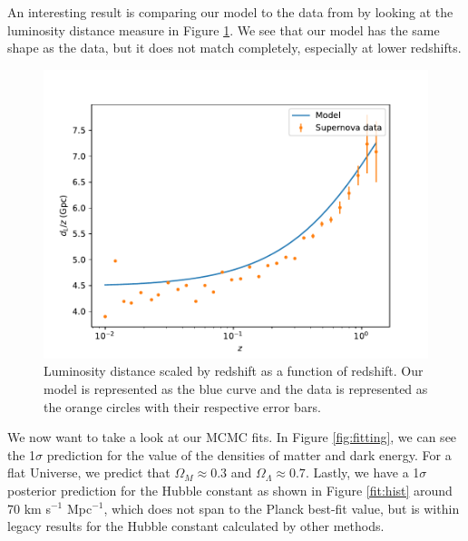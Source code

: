 \documentclass{aa}
\begin{document}
An interesting result is comparing our model to the data from \cite{Betoule_2014} by looking at the luminosity distance measure in Figure \ref{fig:dL}. We see that our model has the same shape as the data, but it does not match completely, especially at lower redshifts.

\begin{figure}[ht]
\centering
\includegraphics[width=\hsize]{figures/dL.pdf}
  \caption{Luminosity distance scaled by redshift as a function of redshift. Our model is represented as the blue curve and the data is represented as the orange circles with their respective error bars.}
     \label{fig:dL}
\end{figure}

We now want to take a look at our MCMC fits. In Figure \ref{fig:fitting}, we can see the 1$\sigma$ prediction for the value of the densities of matter and dark energy. For a flat Universe, we predict that $\Omega_M \approx0.3$ and $\Omega_\Lambda\approx0.7$. Lastly, we have a 1$\sigma$ posterior prediction for the Hubble constant as shown in Figure \ref{fit:hist} around 70 km s$^{-1}$ Mpc$^{-1}$, which does not span to the Planck best-fit value, but is within legacy results for the Hubble constant calculated by other methods.
\end{document}
